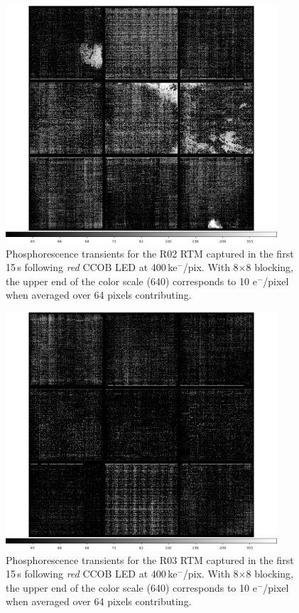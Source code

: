 \begin{figure}[!htbp]
\centering
\includegraphics[width=0.9\textwidth]{sections/figures/phosphorescence-survey/itl_fluor_R02_0-19_rb1_log.png}
\caption{Phosphorescence transients for the R02 RTM captured in the first 15\,s following {\it red} CCOB LED at 400\,ke$^-$/pix. With 8$\times$8 blocking, the upper end of the color scale (640) corresponds to 10 e$^-$/pixel when averaged over 64 pixels contributing.}
\label{fig:phos:R02}
\end{figure}

\begin{figure}[!htbp]
\centering
\includegraphics[width=0.9\textwidth]{sections/figures/phosphorescence-survey/itl_fluor_R03_0-19_rb1_log.png}
\caption{Phosphorescence transients for the R03 RTM captured in the first 15\,s following {\it red} CCOB LED at 400\,ke$^-$/pix. With 8$\times$8 blocking, the upper end of the color scale (640) corresponds to 10 e$^-$/pixel when averaged over 64 pixels contributing.}
\label{fig:phos:R03}
\end{figure}

